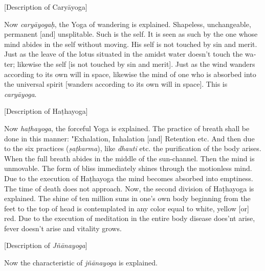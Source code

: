 \begin{otherlanguage}{english}
\begin{tlate}
  \end{tlate}
      \bigskip
    \centerline{\textrm{\small{[Description of Caryāyoga]}}}
      \bigskip
     \begin{tlate}
        Now \textit{caryāyogaḥ}, the Yoga of wandering is explained. Shapeless, unchangeable, permanent [and] unsplitable. Such is the self. It is seen as such by the one whose mind abides in the self without moving. His self is not touched by sin and merit. Just as the leave of the lotus situated in the amidst water doesn't touch the water; likewise the self [is not touched by sin and merit]. Just as the wind wanders according to its own will in space, likewise the mind of one who is absorbed into the universal spirit [wanders according to its own will in space]. This is \textit{caryāyoga}.
      \end{tlate}
       \bigskip
    \centerline{\textrm{\small{[Description of Haṭhayoga]}}}
      \bigskip
      \begin{tlate}
        Now \textit{haṭhayoga}, the forceful Yoga is explained. The practice of breath shall be done in this manner: "Exhalation, Inhalation [and] Retention etc. And then due to the six practices (\textit{ṣaṭkarma}), like \textit{dhauti} etc. the purification of the body arises. When the full breath abides in the middle of the sun-channel. Then the mind is unmovable. The form of bliss immediately shines through the motionless mind. Due to the execution of Haṭhayoga the mind becomes absorbed into emptiness. The time of death does not approach. Now, the second division of Haṭhayoga is explained. The shine of ten million suns in one's own body beginning from the feet to the top of head is contemplated in any color equal to white, yellow [or] red. Due to the execution of meditation in the entire body disease does'nt arise, fever doesn't arise and vitality grows.
      \end{tlate}
    \bigskip
        \centerline{\textrm{\small{[Description of \textit{Jñānayoga}]}}}
          \bigskip
    \begin{tlate}
      Now the characteristic of \textit{jñānayoga} is explained.      

\end{tlate}
\end{otherlanguage}
